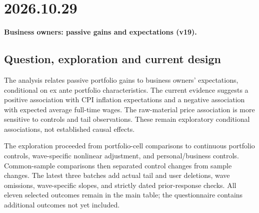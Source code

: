 \section{2026.10.29}
\setcounter{table}{0}
\noindent\textbf{Business owners: passive gains and expectations (v19).}

\subsection{Question, exploration and current design}
The analysis relates passive portfolio gains to business owners' expectations, conditional on ex ante portfolio characteristics. The current evidence suggests a positive association with CPI inflation expectations and a negative association with expected average full-time wages. The raw-material price association is more sensitive to controls and tail observations. These remain exploratory conditional associations, not established causal effects.

The exploration proceeded from portfolio-cell comparisons to continuous portfolio controls, wave-specific nonlinear adjustment, and personal/business controls. Common-sample comparisons then separated control changes from sample changes. The latest three batches add actual tail and user deletions, wave omissions, wave-specific slopes, and strictly dated prior-response checks. All eleven selected outcomes remain in the main table; the questionnaire contains additional outcomes not yet included.

